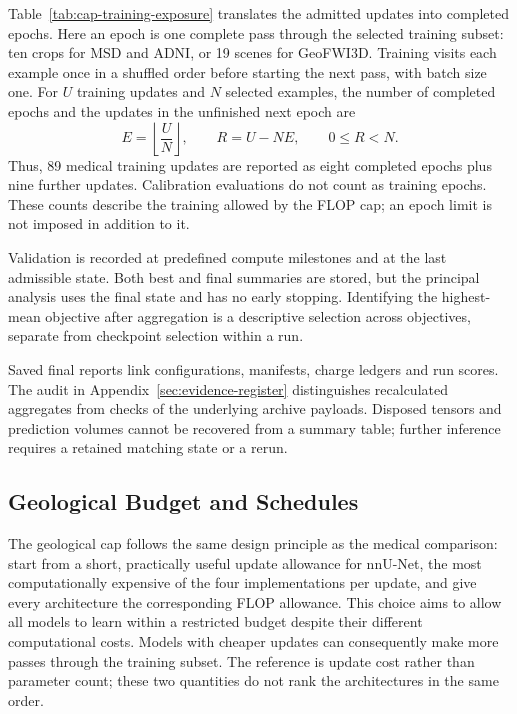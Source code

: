 \documentclass[12pt,a4paper]{article}
\begin{document}
Table~\ref{tab:cap-training-exposure} translates the admitted updates
into completed epochs. Here an epoch is one complete pass through the
selected training subset: ten crops for MSD and ADNI, or 19 scenes for
GeoFWI3D. Training visits each example once in a shuffled order before
starting the next pass, with batch size one. For $U$ training updates
and $N$ selected examples, the number of completed epochs and the
updates in the unfinished next epoch are
\begin{equation}
 E=\left\lfloor\frac{U}{N}\right\rfloor,
 \qquad R=U-NE,\qquad 0\leq R<N.
\label{eq:completed-training-epochs}
\end{equation}
Thus, 89 medical training updates are reported as eight completed
epochs plus nine further updates. Calibration evaluations do not count
as training epochs. These counts describe the training allowed by the
FLOP cap; an epoch limit is not imposed in addition to it.



Validation is recorded at predefined compute milestones and at the last
admissible state. Both best and final summaries are stored, but the
principal analysis uses the final state and has no early stopping.
Identifying the highest-mean objective after aggregation is a descriptive
selection across objectives, separate from checkpoint selection within
a run.

Saved final reports link configurations, manifests, charge ledgers and
run scores. The audit in Appendix~\ref{sec:evidence-register} distinguishes
recalculated aggregates from checks of the underlying archive payloads.
Disposed tensors and prediction volumes cannot be recovered from a
summary table; further inference requires a retained matching state
or a rerun.

\subsection{Geological Budget and Schedules}\label{sec:geological-budget-details}

The geological cap follows the same design principle as the medical
comparison: start from a short, practically useful update allowance for
nnU-Net, the most computationally expensive of the four implementations
per update, and give every architecture the corresponding FLOP allowance.
This choice aims to allow all models to learn within a restricted budget
despite their different computational costs. Models with cheaper updates
can consequently make more passes through the training subset. The
reference is update cost rather than parameter count; these two quantities
do not rank the architectures in the same order.
\end{document}
